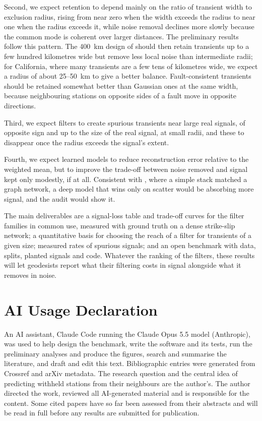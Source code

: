 \documentclass[11pt,a4paper]{article}
\begin{document}
Second, we expect retention to depend mainly on the ratio of transient width to exclusion radius, rising from near zero when the width exceeds the radius to near one when the radius exceeds it, while noise removal declines more slowly because the common mode is coherent over larger distances. The preliminary results follow this pattern. The 400~km design of \citet{bachelot2025} should then retain transients up to a few hundred kilometres wide but remove less local noise than intermediate radii; for California, where many transients are a few tens of kilometres wide, we expect a radius of about 25--50~km to give a better balance. Fault-consistent transients should be retained somewhat better than Gaussian ones at the same width, because neighbouring stations on opposite sides of a fault move in opposite directions.

Third, we expect filters to create spurious transients near large real signals, of opposite sign and up to the size of the real signal, at small radii, and these to disappear once the radius exceeds the signal's extent.

Fourth, we expect learned models to reduce reconstruction error relative to the weighted mean, but to improve the trade-off between noise removed and signal kept only modestly, if at all. Consistent with \citet{bachelot2025}, where a simple stack matched a graph network, a deep model that wins only on scatter would be absorbing more signal, and the audit would show it.

The main deliverables are a signal-loss table and trade-off curves for the filter families in common use, measured with ground truth on a dense strike-slip network; a quantitative basis for choosing the reach of a filter for transients of a given size; measured rates of spurious signals; and an open benchmark with data, splits, planted signals and code. Whatever the ranking of the filters, these results will let geodesists report what their filtering costs in signal alongside what it removes in noise.

\section*{AI Usage Declaration}

An AI assistant, Claude Code running the Claude Opus 5.5 model (Anthropic), was used to help design the benchmark, write the software and its tests, run the preliminary analyses and produce the figures, search and summarise the literature, and draft and edit this text. Bibliographic entries were generated from Crossref and arXiv metadata. The research question and the central idea of predicting withheld stations from their neighbours are the author's. The author directed the work, reviewed all AI-generated material and is responsible for the content. Some cited papers have so far been assessed from their abstracts and will be read in full before any results are submitted for publication.



\end{document}
